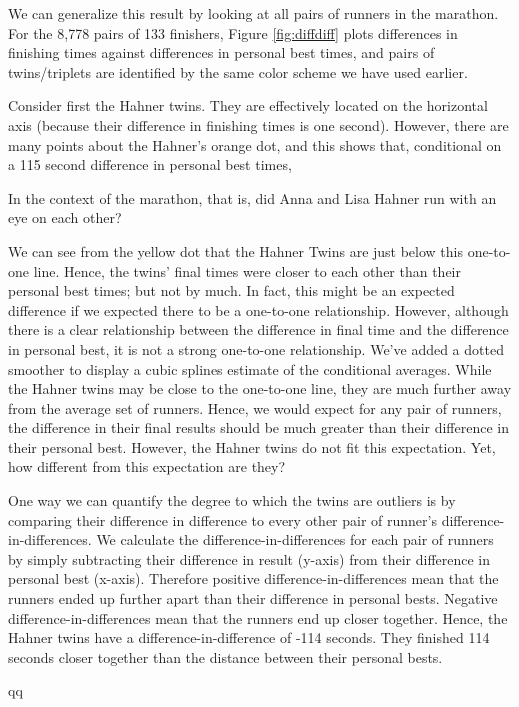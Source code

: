 \documentclass[12pt,titlepage]{article}
\begin{document}
We can generalize this result by looking at all pairs of runners in
the marathon.  For the 8,778 pairs of 133 finishers, Figure
\ref{fig:diffdiff} plots differences in finishing times against
differences in personal best times, and pairs of twins/triplets are
identified by the same color scheme we have used earlier.  

Consider first the Hahner twins.  They are effectively located on the
horizontal axis (because their difference in finishing times is one
second).  However, there are many points about the Hahner's orange
dot, and this shows that, conditional on a 115 second difference in
personal best times, 

In the
context of the marathon, that is, did Anna and Lisa Hahner run with an
eye on each other?


We can see from the yellow dot that the Hahner Twins are just below this one-to-one line.  Hence, the twins' final times were closer to each other than their personal best times; but not by much.  In fact, this might be an expected difference if we expected there to be a one-to-one relationship.     However, although there is a clear relationship between the difference in final time and the difference in personal best, it is not a strong one-to-one relationship.  We've added a dotted smoother to display a cubic splines estimate of the conditional averages.  While the Hahner twins may be close to the one-to-one line, they are much further away from the average set of runners.  Hence, we would expect for any pair of runners, the difference in their final results should be much greater than their difference in their personal best.  However, the Hahner twins do not fit this expectation.   Yet, how different from this expectation are they?

One way we can quantify the degree to which the twins are outliers is by comparing their difference in difference to every other pair of runner's difference-in-differences.  We calculate the difference-in-differences for each pair of runners by simply subtracting their difference in result (y-axis) from their difference in personal best (x-axis).  Therefore positive difference-in-differences mean that the runners ended up further apart than their difference in personal bests.  Negative difference-in-differences mean that the runners end up closer together.  Hence, the Hahner twins have a difference-in-difference of -114 seconds.  They finished 114 seconds closer together than the distance between their personal bests.  


qq
\end{document}
